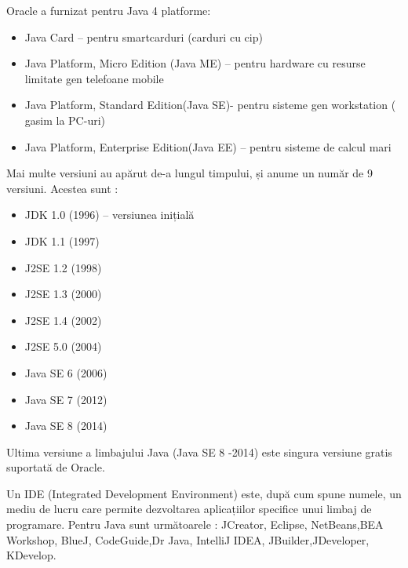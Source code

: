\documentclass[12pt]{book}
\begin{document}
\bigbreak	
Oracle a furnizat pentru Java 4 platforme:
\begin{addmargin}[4em]{1em}
\begin{itemize}
	\item Java Card – pentru smartcarduri (carduri cu cip)
	\item Java Platform, Micro Edition (Java ME) – pentru hardware cu resurse limitate gen telefoane mobile
	\item Java Platform, Standard Edition(Java SE)- pentru sisteme gen workstation ( gasim la PC-uri)
	\item Java Platform, Enterprise Edition(Java EE) – pentru sisteme de calcul mari
\end{itemize}
\end{addmargin}
\bigbreak
Mai multe versiuni au apărut de-a lungul timpului, și anume un număr de 9 versiuni. Acestea sunt :
\begin{addmargin}[4em]{1em}
\begin{itemize}
\item JDK 1.0 (1996) – versiunea inițială
\item JDK 1.1 (1997)
\item J2SE 1.2 (1998)
\item J2SE 1.3 (2000)
\item J2SE 1.4 (2002)
\item J2SE 5.0 (2004)
\item Java SE 6 (2006)
\item Java SE 7 (2012)
\item Java SE 8 (2014)
\end{itemize}
\end{addmargin}
\bigbreak
Ultima versiune a limbajului Java (Java SE 8 -2014) este singura versiune gratis suportată de Oracle.
	
Un IDE (Integrated Development Environment) este, după cum spune numele, un mediu de lucru care permite dezvoltarea aplicațiilor specifice unui limbaj de programare. Pentru Java sunt următoarele : JCreator, Eclipse, NetBeans,BEA Workshop, BlueJ, CodeGuide,Dr Java, IntelliJ IDEA, JBuilder,JDeveloper, KDevelop.
	
\end{document}
